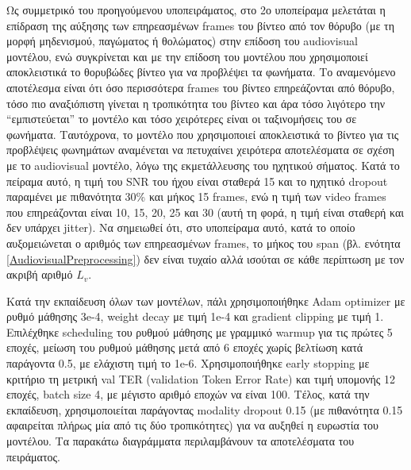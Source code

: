Ως συμμετρικό του προηγούμενου υποπειράματος, στο 2ο υποπείραμα μελετάται η επίδραση της αύξησης των επηρεασμένων frames του βίντεο από τον θόρυβο (με τη μορφή μηδενισμού, παγώματος ή θολώματος) στην επίδοση του audiovisual μοντέλου, ενώ συγκρίνεται και με την επίδοση του μοντέλου που χρησιμοποιεί αποκλειστικά το θορυβώδες βίντεο για να προβλέψει τα φωνήματα. Το αναμενόμενο αποτέλεσμα είναι ότι όσο περισσότερα frames του βίντεο επηρεάζονται από θόρυβο, τόσο πιο αναξιόπιστη γίνεται η τροπικότητα του βίντεο και άρα τόσο λιγότερο την ``εμπιστεύεται'' το μοντέλο και τόσο χειρότερες είναι οι ταξινομήσεις του σε φωνήματα. Ταυτόχρονα, το μοντέλο που χρησιμοποιεί αποκλειστικά το βίντεο για τις προβλέψεις φωνημάτων αναμένεται να πετυχαίνει χειρότερα αποτελέσματα σε σχέση με το audiovisual μοντέλο, λόγω της εκμετάλλευσης του ηχητικού σήματος. Κατά το πείραμα αυτό, η τιμή του SNR του ήχου είναι σταθερά 15 και το ηχητικό dropout παραμένει με πιθανότητα 30\% και μήκος 15 frames, ενώ η τιμή των video frames που επηρεάζονται είναι 10, 15, 20, 25 και 30 (αυτή τη φορά, η τιμή είναι σταθερή και δεν υπάρχει jitter). Να σημειωθεί ότι, στο υποπείραμα αυτό, κατά το οποίο αυξομειώνεται ο αριθμός των επηρεασμένων frames, το μήκος του span (βλ. ενότητα \ref{AudiovisualPreprocessing}) δεν είναι τυχαίο αλλά ισούται σε κάθε περίπτωση με τον ακριβή αριθμό $L_v$.

Κατά την εκπαίδευση όλων των μοντέλων, πάλι χρησιμοποιήθηκε Adam optimizer με ρυθμό μάθησης 3e-4, weight decay με τιμή 1e-4 και gradient clipping με τιμή 1. Επιλέχθηκε scheduling του ρυθμού μάθησης με γραμμικό warmup για τις πρώτες 5 εποχές, μείωση του ρυθμού μάθησης μετά από 6 εποχές χωρίς βελτίωση κατά παράγοντα 0.5, με ελάχιστη τιμή το 1e-6.  Χρησιμοποιήθηκε early stopping με κριτήριο τη μετρική val TER (validation Token Error Rate) και τιμή υπομονής 12 εποχές, batch size 4, με μέγιστο αριθμό εποχών να είναι 100. Τέλος, κατά την εκπαίδευση, χρησιμοποιείται παράγοντας modality dropout 0.15 (με πιθανότητα 0.15 αφαιρείται πλήρως μία από τις δύο τροπικότητες) για να αυξηθεί η ευρωστία του μοντέλου. Τα παρακάτω διαγράμματα περιλαμβάνουν τα αποτελέσματα του πειράματος.

